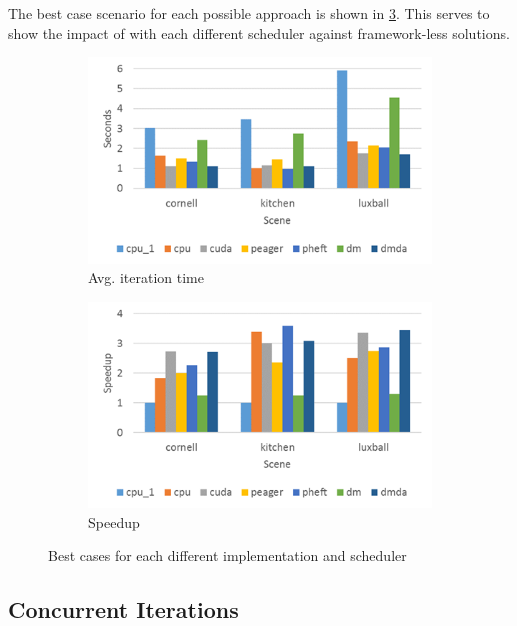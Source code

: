 \documentclass[main.tex]{subfiles}
\begin{document}
The best case scenario for each possible approach is shown in \cref{fig:prof:overall}. This serves to show the impact of \starpu with each different scheduler against framework-less solutions.

\begin{figure}[!htp]
  \centering
  \begin{subfigure}{.5\textwidth}
    \centering
    \includegraphics[width=\linewidth]{profiling/1iter_time}
    \caption{Avg. iteration time \label{fig:prof:overall_time}}
  \end{subfigure}%
  \begin{subfigure}{.5\textwidth}
    \centering
    \includegraphics[width=\linewidth]{profiling/1iter_speedup}
    \caption{Speedup \label{fig:prof:overall_speedup}}
  \end{subfigure}
  \caption{Best cases for each different implementation and scheduler \label{fig:prof:overall}}
\end{figure}

\subsection{Concurrent Iterations}
\end{document}
